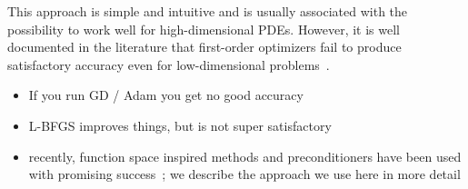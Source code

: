 This approach is simple and intuitive and is usually associated with the possibility to work well for high-dimensional PDEs.
However, it is well documented in the literature that first-order optimizers fail to produce satisfactory accuracy even for low-dimensional problems~\cite{}. 

\begin{itemize}
    \item If you run GD / Adam you get no good accuracy~\cite{?}
    \item L-BFGS improves things, but is not super satisfactory
    \item recently, function space inspired methods and preconditioners have been used with promising success~\cite[text]{CPINNs, ENG, preconditioning?, FS paper, Navier-Stokes}; we describe the approach we use here in more detail 
\end{itemize}

